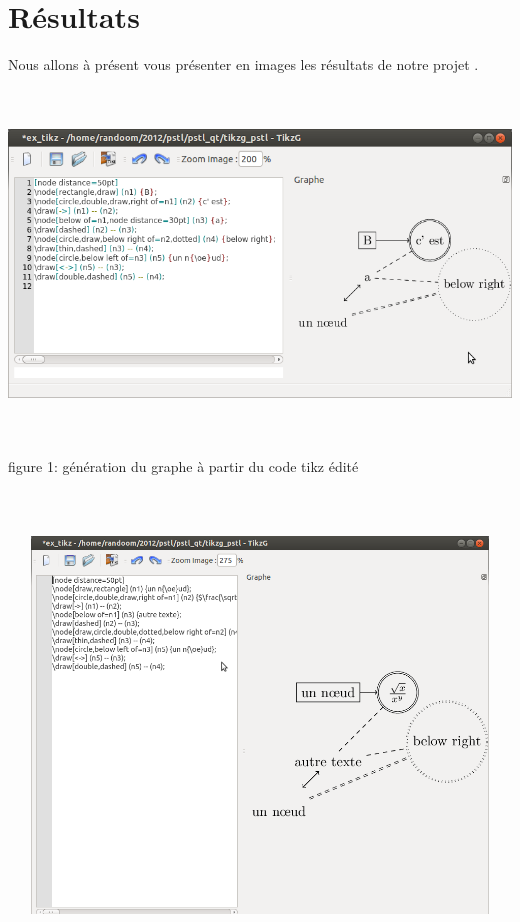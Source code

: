 \documentclass[a4paper]{report}
\begin{document}
\section{Résultats}
  Nous allons à présent vous présenter en images les résultats de notre projet .
\newline
  \includegraphics[width=15cm, height=10cm]{img/r_1.png} 
\newline
figure 1: génération du graphe à partir du code tikz édité
\\
\\
\\
\\
  \includegraphics[width=15cm, height=10cm]{img/r_41.png} 
\\
\end{document}
